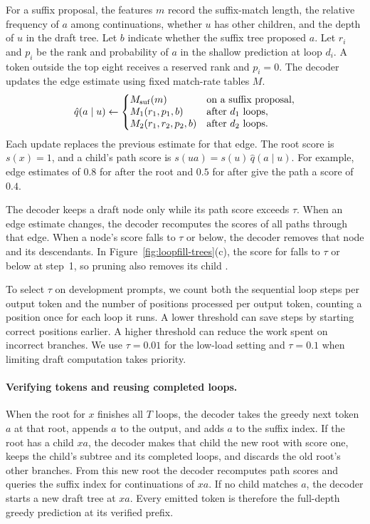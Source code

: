 For a suffix proposal, the features $m$ record the suffix-match
length, the relative frequency of $a$ among continuations, whether $u$ has other
children, and the depth of $u$ in the draft tree. Let $b$ indicate
whether the suffix tree proposed $a$. Let $r_i$ and $p_i$ be the rank
and probability of $a$ in the shallow prediction at loop $d_i$.
A token outside the top eight receives a reserved rank and $p_i=0$.
The decoder updates the edge estimate using fixed match-rate tables $M$.
\[
\hat q(a\mid u)\gets
\left\{\begin{array}{@{}l@{\quad}l@{}}
 M_{\mathrm{suf}}(m)  & \mbox{on a suffix proposal},\\
 M_1(r_1,p_1,b)       & \mbox{after $d_1$ loops},\\
 M_2(r_1,r_2,p_2,b)   & \mbox{after $d_2$ loops}.
\end{array}\right.
\]
Each update replaces the previous estimate for that edge. The root
score is $s(x)=1$, and a child's path score is
$s(ua)=s(u)\,\hat q(a\mid u)$. For example, edge estimates of $0.8$
for  after the root and $0.5$ for  after
 give the path   a score of $0.4$.

The decoder keeps a draft node only while its path score exceeds
$\tau$. When an edge estimate changes, the decoder recomputes the
scores of all paths through that edge. When a node's score falls to
$\tau$ or below, the decoder removes that node and its descendants.
In Figure~\ref{fig:loopfill-trees}(c), the score for  falls to
$\tau$ or below at step~1, so pruning  also removes its child
.

To select $\tau$ on development prompts, we count both the sequential
loop steps per output token and the number of positions processed per
output token, counting a position once for each loop it runs.
A lower threshold can save steps
by starting correct positions earlier. A higher threshold can reduce
the work spent on incorrect branches. We use $\tau=0.01$ for the
low-load setting and $\tau=0.1$ when limiting draft computation takes
priority.

\paragraph{Verifying tokens and reusing completed loops.}
When the root for $x$ finishes all $T$ loops, the decoder takes the
greedy next token $a$ at that root, appends $a$ to the output, and
adds $a$ to the suffix index. If the root has a child $xa$, the
decoder makes that child the new root with score one, keeps the
child's subtree and its completed loops, and discards the old root's
other branches. From this new root the decoder recomputes path scores
and queries the suffix index for continuations of $xa$. If no child
matches $a$, the decoder starts a
new draft tree at $xa$. Every emitted token is therefore the full-depth
greedy prediction at its verified prefix.

